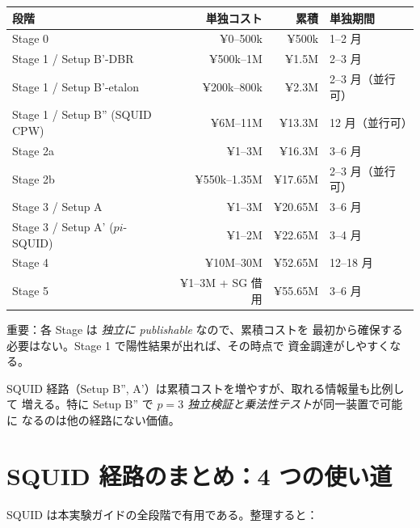 \documentclass[11pt,a4paper]{article}
\def\pi{pi}%
\def\textbf#1{#1}%
\begin{document}
\begin{center}
\renewcommand{\arraystretch}{1.2}
\begin{tabular}{lrrl}
\toprule
段階 & 単独コスト & 累積 & 単独期間 \\
\midrule
Stage 0                            & ¥0--500k      & ¥500k  & 1--2 月 \\
Stage 1 / Setup B'-DBR             & ¥500k--1M     & ¥1.5M  & 2--3 月 \\
Stage 1 / Setup B'-etalon          & ¥200k--800k   & ¥2.3M  & 2--3 月（並行可） \\
Stage 1 / Setup B'' (SQUID CPW)    & ¥6M--11M      & ¥13.3M & 12 月（並行可） \\
Stage 2a                           & ¥1--3M        & ¥16.3M & 3--6 月 \\
Stage 2b                           & ¥550k--1.35M  & ¥17.65M & 2--3 月（並行可） \\
Stage 3 / Setup A                  & ¥1--3M        & ¥20.65M & 3--6 月 \\
Stage 3 / Setup A' ($\pi$-SQUID)   & ¥1--2M        & ¥22.65M & 3--4 月 \\
Stage 4                            & ¥10M--30M     & ¥52.65M & 12--18 月 \\
Stage 5                            & ¥1--3M + SG 借用 & ¥55.65M & 3--6 月 \\
\bottomrule
\end{tabular}
\end{center}

\textbf{重要}：各 Stage は \emph{独立に publishable} なので、累積コストを
最初から確保する必要はない。Stage 1 で陽性結果が出れば、その時点で
資金調達がしやすくなる。

\textbf{SQUID 経路（Setup B'', A'）は累積コストを増やすが、取れる情報量も比例して
増える}。特に Setup B'' で \emph{$p=3$ 独立検証と乗法性テスト}が同一装置で可能に
なるのは他の経路にない価値。

\section{SQUID 経路のまとめ：4 つの使い道}

SQUID は本実験ガイドの全段階で有用である。整理すると：
\end{document}
